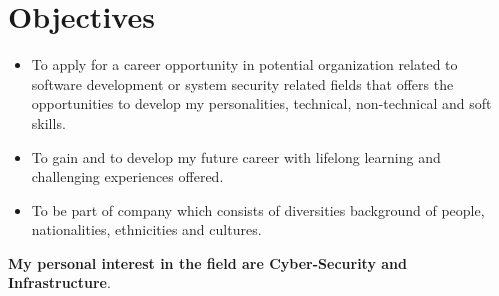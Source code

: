 \vspace{0.2cm}
\section{Objectives}
\vspace{-0.2cm}
    \begin{itemize}[noitemsep]
        \item To apply for a career opportunity in potential organization related to software development or system security related fields that offers the opportunities to develop my personalities, technical, non-technical and soft skills. 
        \item To gain and to develop my future career with lifelong learning and challenging experiences offered.
        \item To be part of company which consists of diversities background of people, nationalities, ethnicities and cultures.
    \end{itemize}
\textbf{My personal interest in the field are Cyber-Security and Infrastructure}.